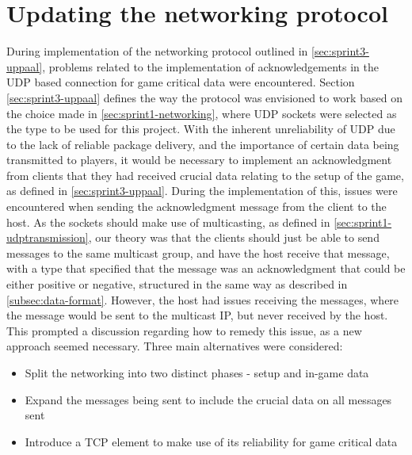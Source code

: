 \section{Updating the networking protocol}\label{sec:update-network-protocol}
During implementation of the networking protocol outlined in \autoref{sec:sprint3-uppaal}, problems related to the implementation of acknowledgements in the UDP based connection for game critical data were encountered.
Section \ref{sec:sprint3-uppaal} defines the way the protocol was envisioned to work based on the choice made in \autoref{sec:sprint1-networking}, where UDP sockets were selected as the type to be used for this project.
With the inherent unreliability of UDP due to the lack of reliable package delivery, and the importance of certain data being transmitted to players, it would be necessary to implement an acknowledgment from clients that they had received crucial data relating to the setup of the game, as defined in \autoref{sec:sprint3-uppaal}.
During the implementation of this, issues were encountered when sending the acknowledgment message from the client to the host.
As the sockets should make use of multicasting, as defined in \autoref{sec:sprint1-udptransmission}, our theory was that the clients should just be able to send messages to the same multicast group, and have the host receive that message, with a type that specified that the message was an acknowledgment that could be either positive or negative, structured in the same way as described in \autoref{subsec:data-format}.
However, the host had issues receiving the messages, where the message would be sent to the multicast IP, but never received by the host.
This prompted a discussion regarding how to remedy this issue, as a new approach seemed necessary.
Three main alternatives were considered:
\begin{itemize}
    \item Split the networking into two distinct phases - setup and in-game data
    \item Expand the messages being sent to include the crucial data on all messages sent
    \item Introduce a TCP element to make use of its reliability for game critical data
\end{itemize}

